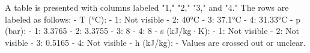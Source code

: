 A table is presented with columns labeled "1," "2," "3," and "4." The rows are labeled as follows:  
- T (°C):  
  - 1: Not visible  
  - 2: 40°C  
  - 3: 37.1°C  
  - 4: 31.33°C  
- p (bar):  
  - 1: 3.3765  
  - 2: 3.3755  
  - 3: 8  
  - 4: 8  
- s (kJ/kg·K):  
  - 1: Not visible  
  - 2: Not visible  
  - 3: 0.5165  
  - 4: Not visible  
- h (kJ/kg):  
  - Values are crossed out or unclear.